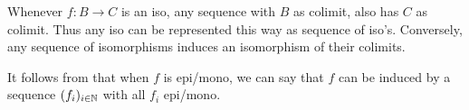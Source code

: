 \begin{remark}\label{rmkIsoEpiMonoMapColimit}
  Whenever $f:B \to C$ is an iso, any sequence with $B$ as colimit, also has $C$ as colimit. 
  Thus any iso can be represented this way as sequence of iso's. 
  Conversely, any sequence of isomorphisms induces an isomorphism of their colimits. 

  It follows from  that when $f$ is epi/mono, 
  we can say that $f$ can be induced by a sequence 
  $(f_i)_{i\in \mathbb{N}}$ with all $f_i$ epi/mono. 
\end{remark}



